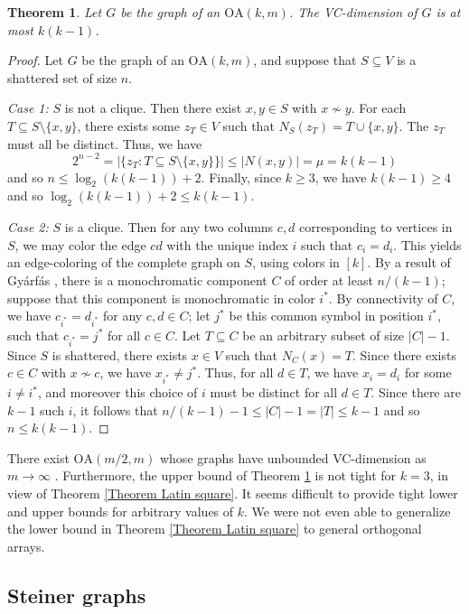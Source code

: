 \documentclass{article}
\newcommand\sm{\setminus}
\newtheorem{thm}{Theorem}
\theoremstyle{definition}
\begin{document}
\begin{thm} \label{Theorem OA upper bound}
    Let $G$ be the graph of an $\mathrm{OA}(k,m)$. The VC-dimension of $G$ is at most $k(k-1)$. 
\end{thm}
\begin{proof}
    Let $G$ be the graph of an $\mathrm{OA}(k,m)$, and suppose that $S\subseteq V$ is a shattered set of size $n$.

    \textit{Case 1:} $S$ is not a clique. Then there exist $x,y\in S$ with $x\not\sim y$. For each $T\subseteq S\sm\{x,y\}$, there exists some $z_T\in V$ such that $N_S(z_T)=T\cup\{x,y\}$. The $z_T$ must all be distinct. Thus,
    we have
    $$2^{n-2}=|\{z_T:T\subseteq S\sm\{x,y\}\}|\le|N(x,y)|=\mu=k(k-1)$$
    and so $n\le\log_2(k(k-1))+2$. Finally, since $k\ge 3$, we have $k(k-1)\ge 4$ and so $\log_2(k(k-1))+2\le k(k-1).$

    \textit{Case 2:} $S$ is a clique. Then for any two columns $c,d$ corresponding to vertices in $S$, we may color the edge $cd$ with the unique index $i$ such that $c_i=d_i$. This yields an edge-coloring of the complete graph on $S$, using colors in $[k]$. By a result of Gy\'arf\'as \cite{gyarfas1977partition}, there is a monochromatic component $C$ of order at least $n/(k-1)$; suppose that this component is monochromatic in color $i^*$. By connectivity of $C$, we have $c_{i^*}=d_{i^*}$ for any $c,d\in C$; let $j^*$ be this common symbol in position $i^*$, such that $c_{i^*}=j^*$ for all $c\in C$. Let $T\subseteq C$ be an arbitrary subset of size $|C|-1$. Since $S$ is shattered, there exists $x\in V$ such that $N_C(x)=T$. Since there exists $c\in C$ with $x\not\sim c$, we have $x_{i^*}\ne j^*$. Thus, for all $d\in T$, we have $x_{i}=d_i$ for some $i\ne i^*$, and moreover this choice of $i$ must be distinct for all $d\in T$. Since there are $k-1$ such $i$, it follows that $n/(k-1)-1\le |C|-1=|T|\le k-1$ and so $n\le k(k-1)$.
\end{proof}

There exist $\mathrm{OA}(m/2,m)$ whose graphs have unbounded VC-dimension as $m\to\infty$ \cite{baker2008graphs}. Furthermore, the upper bound of Theorem \ref{Theorem OA upper bound} is not tight for $k=3$, in view of Theorem \ref{Theorem Latin square}. It seems difficult to provide tight lower and upper bounds for arbitrary values of $k$. We were not even able to generalize the lower bound in Theorem \ref{Theorem Latin square} to general orthogonal arrays.

\subsection{Steiner graphs}
\end{document}
